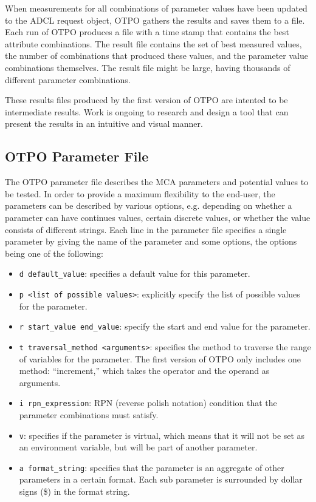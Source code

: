 When measurements for all combinations of parameter values have been
updated to the ADCL request object, OTPO gathers the results and saves
them to a file. Each run of OTPO produces a file with a time stamp
that contains the best attribute combinations. The result file
contains the set of best measured values, the number of combinations
that produced these values, and the parameter value combinations
themselves. The result file might be large, having thousands of
different parameter combinations.

These results files produced by the first version of OTPO are intented
to be intermediate results.  Work is ongoing to research and design a
tool that can present the results in an intuitive and visual manner.


\subsection{OTPO Parameter File}

The OTPO parameter file describes the MCA parameters and potential
values to be tested. In order to provide a maximum flexibility to the
end-user, the parameters can be described by various options,
e.g. depending on whether a parameter can have continues values,
certain discrete values, or whether the value consists of different
strings. Each line in the parameter file specifies a single parameter
by giving the name of the parameter and some options, the options
being one of the following:
\begin{itemize}
\item {\tt d default\_\-value}: specifies a default value for this
  parameter.
\item {\tt p <list of possible values>}: explicitly specify the list
  of possible values for the parameter.
\item {\tt r start\_\-value end\_\-value}: specify the start and end
  value for the parameter.
\item {\tt t traversal\_\-method <arguments>}: specifies the method to
  traverse the range of variables for the parameter. The first version
  of OTPO only includes one method: ``increment,'' which takes the
  operator and the operand as arguments.
\item {\tt i rpn\_\-expression}: RPN (reverse polish notation)
  condition that the parameter combinations must satisfy.
\item {\tt v}: specifies if the parameter is virtual, which means that
  it will not be set as an environment variable, but will be part of
  another parameter.
\item {\tt a format\_\-string}: specifies that the parameter is an
  aggregate of other parameters in a certain format. Each sub
  parameter is surrounded by dollar signs (\$) in the format string.
\end{itemize}

